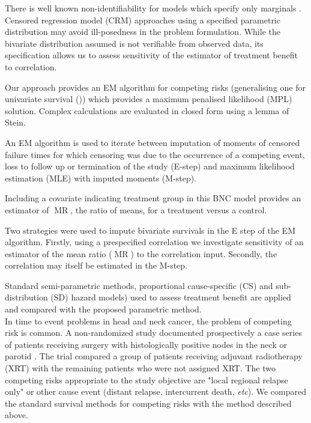 \documentclass[twoside,a4paper,12pt]{article}
\def\MR{\operatorname{MR}}
\theoremstyle{plain}
\theoremstyle{definition}
\begin{document}
There is well known non-identifiability for models which specify only marginals \cite{Crowder1991}. 
Censored regression model (CRM) approaches using a specified parametric 
distribution may avoid ill-posedness in the problem formulation.
While the bivariate distribution assumed is not verifiable from observed data, 
its specification allows us to assess 
sensitivity of the estimator of treatment benefit to correlation. %

Our approach provides an EM algorithm for competing risks (generalising one for univariate survival  (\cite{Aitkin1981})) which provides a maximum penalised likelihood (MPL) solution. Complex calculations are evaluated in closed form using a lemma of Stein.

An EM algorithm is used to iterate between imputation of moments of censored failure 
times for which censoring was due to the occurrence of a competing event, loss 
to follow up or termination of the study  (E-step)
and maximum likelihood estimation (MLE) with imputed moments (M-step). 

Including a covariate  indicating treatment group  in this BNC model 
provides an estimator of $\MR$, the ratio of means, for a treatment versus a control. 

Two strategies were used to impute bivariate survivals in the E step of the EM 
algorithm. 
Firstly, using  a prespecified correlation we investigate sensitivity of an  
estimator of the mean ratio ($\MR$) to the correlation input. 
Secondly, the correlation  may itself be estimated in the M-step. 

Standard semi-parametric methods, 
proportional cause-specific (CS) and sub-distribution (SD) hazard models) 
used to assess treatment benefit are applied 
and compared with the proposed parametric method. 
\\


In time to event problems in head and neck cancer, the problem of competing risk 
is common. 
A non-randomized study  documented prospectively a case series 
of patients receiving surgery
with histologically positive nodes in the neck or parotid \citep{OBrien1997} . 
The trial compared a group of patients  receiving adjuvant radiotherapy (XRT) 
with the remaining patients who were not assigned XRT. 
The two competing risks appropriate to the study objective are "local regional 
relapse only" or other cause event (distant relapse, intercurrent death, 
\emph{etc}). 
We compared the standard survival methods for competing risks with the method 
described above.\\
\end{document}
